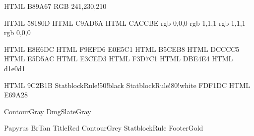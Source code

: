 

\definecolor {FooterGold}	{HTML} {B89A67} %
\definecolor {Papyrus}		{RGB}	{241,230,210}

\definecolor {TitleRed}		{HTML}	{58180D} %
\definecolor {TitleGold}	{HTML}	{C9AD6A} %
\definecolor {ContourGray}	{HTML}	{CACCBE} %
\definecolor {TitleOuter}	{rgb}	{0,0,0}
\definecolor {TitleInner}	{rgb}	{1,1,1}
\definecolor {SubtitleOuter}	{rgb}	{1,1,1}
\definecolor {SubtitleInner}	{rgb}	{0,0,0}

\definecolor {BrGreen}      {HTML} {E8E6DC} %
\definecolor {BrTan}		{HTML} {F9EFD6} %
\definecolor {PhbLightGreen}{HTML} {E0E5C1} %
\definecolor {PhbLightCyan} {HTML} {B5CEB8} %
\definecolor {PhbMauve}     {HTML} {DCCCC5} %
\definecolor {PhbTan}       {HTML} {E5D5AC} %
\definecolor {DmgLavender}  {HTML} {E3CED3} %
\definecolor {DmgCoral}     {HTML} {F3D7C1} %
\definecolor {DmgSlateGray} {HTML} {DBE4E4} %
\definecolor {DmgPatina}	{HTML} {d1e0d1} %


\definecolor	{StatblockRule}		{HTML}	{9C2B1B}				%
			{StatblockRule!50!black}	%
			{StatblockRule!80!white}	%
\definecolor	{StatblockBackground}{HTML}	{FDF1DC}				%
\definecolor	{StatblockRibbon}	{HTML}	{E69A28}				%

 {ContourGray}
 {DmgSlateGray}


		{Papyrus}
	{BrTan}
	{TitleRed}
	{ContourGrey}
		{StatblockRule}
		{FooterGold}

